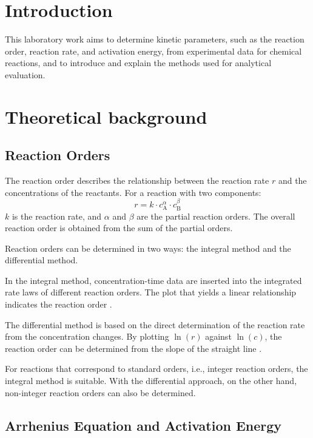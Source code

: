 \section{Introduction}

This laboratory work aims to determine kinetic parameters, such as the reaction
order, reaction rate, and activation energy, from experimental data for
chemical reactions, and to introduce and explain the methods used for
analytical evaluation.

\section{Theoretical background}

\subsection{Reaction Orders}

The reaction order describes the relationship between the reaction rate $r$ and the concentrations of the reactants. For a reaction with two components:
\begin{equation}
r = k \cdot c_{\text{A}}^\alpha \cdot c_{\text{B}}^\beta
\end{equation}
$k$ is the reaction rate, and $\alpha$ and $\beta$ are the partial reaction orders. The overall reaction order is obtained from the sum of the partial orders.

Reaction orders can be determined in two ways: the integral method and the differential method.

In the integral method, concentration-time data are inserted into the integrated rate laws of different reaction orders. The plot that yields a linear relationship indicates the reaction order \citep{sulciute_kinetics_rate_order}.

The differential method is based on the direct determination of the reaction rate from the concentration changes. By plotting $\ln(r)$ against $\ln(c)$, the reaction order can be determined from the slope of the straight line \citep{sulciute_kinetics_theory}.

For reactions that correspond to standard orders, i.e., integer reaction orders, the integral method is suitable. With the differential approach, on the other hand, non-integer reaction orders can also be determined.

\subsection{Arrhenius Equation and Activation Energy}

